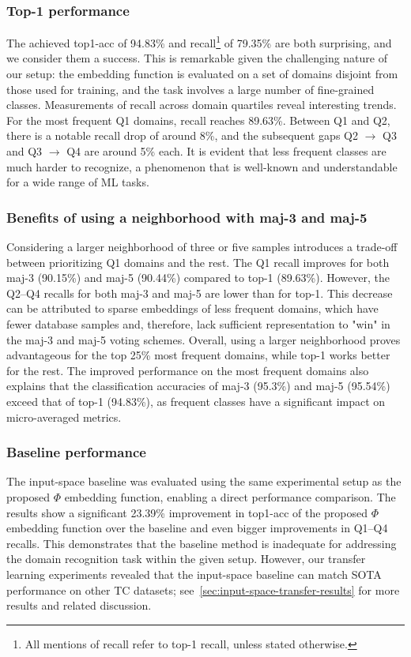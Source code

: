 \documentclass[lettersize,journal,twoside,article]{IEEEtran}
\begin{document}
\subsubsection{Top-1 performance} 
The achieved top1-acc of 94.83\% and recall\footnote{All mentions of recall refer to top-1 recall, unless stated otherwise.} of 79.35\% are both surprising, and we consider them a success. This is remarkable given the challenging nature of our setup: the embedding function is evaluated on a set of domains disjoint from those used for training, and the task involves a large number of fine-grained classes. Measurements of recall across domain quartiles reveal interesting trends. For the most frequent Q1 domains, recall reaches 89.63\%. Between Q1 and Q2, there is a notable recall drop of around 8\%, and the subsequent gaps Q2 $\to$ Q3 and Q3 $\to$ Q4 are around 5\% each. It is evident that less frequent classes are much harder to recognize, a phenomenon that is well-known and understandable for a wide range of ML tasks. 

\subsubsection{Benefits of using a neighborhood with maj-3 and \mbox{maj-5}}
Considering a larger neighborhood of three or five samples introduces a trade-off between prioritizing Q1 domains and the rest. The Q1 recall improves for both maj-3 (90.15\%) and maj-5 (90.44\%) compared to top-1 (89.63\%). However, the Q2--Q4 recalls for both maj-3 and maj-5 are lower than for top-1. This decrease can be attributed to sparse embeddings of less frequent domains, which have fewer database samples and, therefore, lack sufficient representation to "win" in the maj-3 and maj-5 voting schemes. Overall, using a larger neighborhood proves advantageous for the top 25\% most frequent domains, while top-1 works better for the rest. The improved performance on the most frequent domains also explains that the classification accuracies of maj-3 (95.3\%) and maj-5 (95.54\%) exceed that of top-1 (94.83\%), as frequent classes have a significant impact on micro-averaged metrics.

\subsubsection{Baseline performance}
The input-space baseline was evaluated using the same experimental setup as the proposed $\Phi$ embedding function, enabling a direct performance comparison. The results show a significant 23.39\% improvement in top1-acc of the proposed $\Phi$ embedding function over the baseline and even bigger improvements in Q1--Q4 recalls. This demonstrates that the baseline method is inadequate for addressing the domain recognition task within the given setup. However, our transfer learning experiments revealed that the input-space baseline can match SOTA performance on other TC datasets; see~\ref{sec:input-space-transfer-results} for more results and related discussion.
\end{document}
